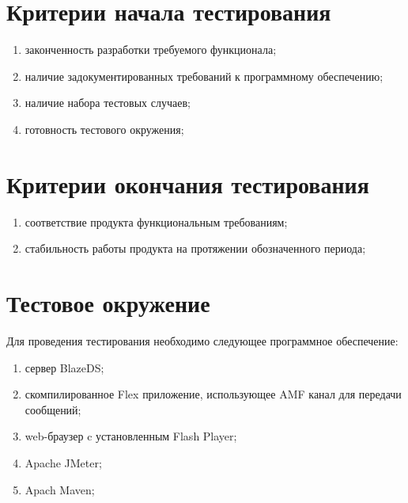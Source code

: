 \section{Критерии начала тестирования}

\begin{enumerate}
\item законченность разработки требуемого функционала;
\item наличие задокументированных требований к программному обеспечению;
\item наличие набора тестовых случаев;
\item готовность тестового окружения;
\end{enumerate}

\section{Критерии окончания тестирования}

\begin{enumerate}
\item соответствие продукта функциональным требованиям;
\item стабильность работы продукта на протяжении обозначенного периода;
\end{enumerate}

\section{Тестовое окружение}

Для проведения тестирования необходимо следующее программное обеспечение:

\begin{enumerate}
\item сервер BlazeDS;
\item скомпилированное Flex приложение, использующее AMF канал для передачи сообщений;
\item web-браузер c установленным Flash Player;
\item Apache JMeter;
\item Apach Maven;
\end{enumerate}
